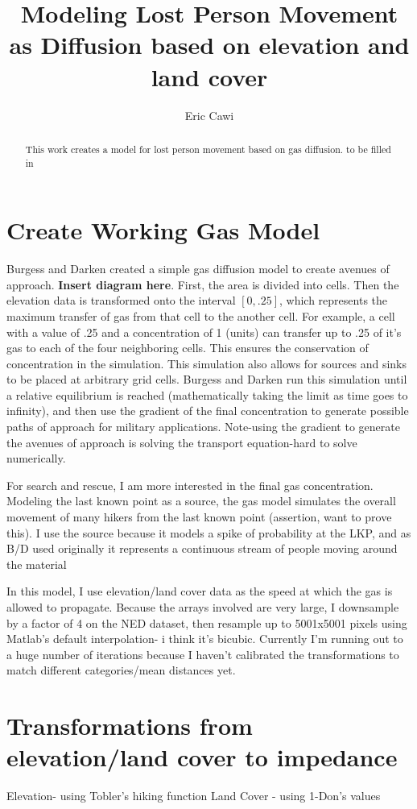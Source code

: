 \documentclass[]{article}
\title{Modeling Lost Person Movement as Diffusion based on elevation and land cover}
\author{Eric Cawi}
\begin{document}
\maketitle

\begin{abstract}
This work creates a model for lost person movement based on gas diffusion. to be filled in
\end{abstract}
\tableofcontents

\section{Create Working Gas Model}
Burgess and Darken created a simple gas diffusion model to create avenues of approach. \textbf{Insert diagram here}. First, the area is divided into cells. Then the elevation data is transformed onto the interval $[0,.25]$, which represents the maximum transfer of gas from that cell to the another cell. For example, a cell with a value of .25 and a concentration of 1 (units) can transfer up to .25 of it's gas to each of the four neighboring cells. This ensures the conservation of concentration in the simulation. This simulation also allows for sources and sinks to be placed at arbitrary grid cells. Burgess and Darken run this simulation until a relative equilibrium is reached (mathematically taking the limit as time goes to infinity), and then use the gradient of the final concentration to generate possible paths of approach for military applications. Note-using the gradient to generate the avenues of approach is solving the transport equation-hard to solve numerically.

For search and rescue, I am more interested in the final gas concentration. Modeling the last known point as a source, the gas model simulates the overall movement of many hikers from the last known point (assertion, want to prove this). I use the source because it models a spike of probability at the LKP, and as B/D used originally it represents a continuous stream of people moving around the material

In this model, I use elevation/land cover data as the speed at which the gas is allowed to propagate. Because the arrays involved are very large, I downsample by a factor of 4 on the NED dataset, then resample up to 5001x5001 pixels using Matlab's default interpolation- i think it's bicubic. Currently I'm running out to a huge number of iterations because I haven't calibrated the transformations to match different categories/mean distances yet.
\section{Transformations from elevation/land cover to impedance}
Elevation- using Tobler's hiking function
Land Cover - using 1-Don's values
\end{document}
